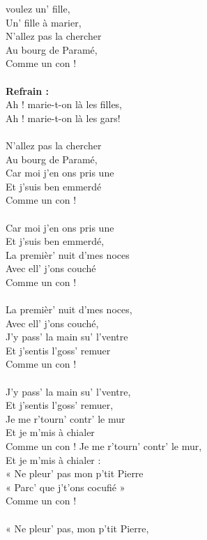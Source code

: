 
 voulez un' fille,
\\Un' fille à marier,
\\N'allez pas la chercher
\\Au bourg de Paramé,
\\Comme un con !
\\\\\textbf{Refrain :}
\\Ah ! marie-t-on là les filles,
\\Ah ! marie-t-on là les gars!
\\\\N'allez pas la chercher
\\Au bourg de Paramé,
\\Car moi j'en ons pris une
\\Et j'suis ben emmerdé
\\Comme un con !
\\\\Car moi j'en ons pris une
\\Et j'suis ben emmerdé,
\\La premièr' nuit d'mes noces
\\Avec ell' j'ons couché
\\Comme un con !
\\\\La premièr' nuit d'mes noces,
\\Avec ell' j'ons couché,
\\J'y pass' la main su' l'ventre
\\Et j'sentis l'goss' remuer
\\Comme un con !
\\\\J'y pass' la main su' l'ventre,
\\Et j'sentis l'goss' remuer,
\\Je me r'tourn' contr' le mur
\\Et je m'mis à chialer
\\Comme un con !
\breakpage
Je me r'tourn' contr' le mur,
\\Et je m'mis à chialer :
\\« Ne pleur' pas mon p'tit Pierre
\\« Parc' que j't'ons cocufié »
\\Comme un con !
\\\\« Ne pleur' pas, mon p'tit Pierre,
